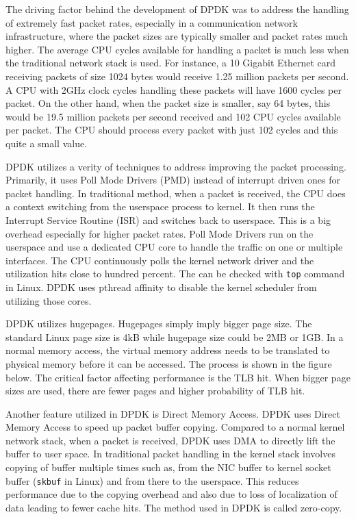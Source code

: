 \documentclass[english, 12pt, a4paper, elec, utf8, a-1b, online]{aaltothesis}
\begin{document}
The driving factor behind the development of DPDK was to address the handling of extremely fast packet rates, especially in a communication network infrastructure, where the packet sizes are typically smaller and packet rates much higher. The average CPU cycles available for handling a packet is much less when the traditional network stack is used. For instance, a 10 Gigabit Ethernet card receiving packets of size 1024 bytes would receive 1.25 million packets per second. A CPU with 2GHz clock cycles handling these packets will have 1600 cycles per packet. On the other hand, when the packet size is smaller, say 64 bytes, this would be 19.5 million packets per second received and 102 CPU cycles available per packet. The CPU should process every packet with just 102 cycles and this quite a small value.

DPDK utilizes a verity of techniques to address improving the packet processing. Primarily, it uses Poll Mode Drivers (PMD) instead of interrupt driven ones for packet handling. In traditional method, when a packet is received, the CPU does a context switching from the userspace process to kernel. It then runs the Interrupt Service Routine (ISR) and switches back to userspace. This is a big overhead especially for higher packet rates. Poll Mode Drivers run on the userspace and use a dedicated CPU core to handle the traffic on one or multiple interfaces. The CPU continuously polls the kernel network driver and the utilization hits close to hundred percent. The can be checked with \lstinline{top} command in Linux. DPDK uses pthread affinity to disable the kernel scheduler from utilizing those cores.

DPDK utilizes hugepages. Hugepages simply imply bigger page size. The standard Linux page size is 4kB while hugepage size could be 2MB or 1GB. In a normal memory access, the virtual memory address needs to be translated to physical memory before it can be accessed. The process is shown in the figure below. The critical factor affecting performance is the TLB hit. When bigger page sizes are used, there are fewer pages and higher probability of TLB hit.


Another feature utilized in DPDK is Direct Memory Access. DPDK uses Direct Memory Access to speed up packet buffer copying. Compared to a normal kernel network stack, when a packet is received, DPDK uses DMA to directly lift the buffer to user space. In traditional packet handling in the kernel stack involves copying of buffer multiple times such as, from the NIC buffer to kernel socket buffer (\lstinline{skbuf} in Linux) and from there to the userspace. This reduces performance due to the copying overhead and also due to loss of localization of data leading to fewer cache hits. The method used in DPDK is called zero-copy.
\end{document}
